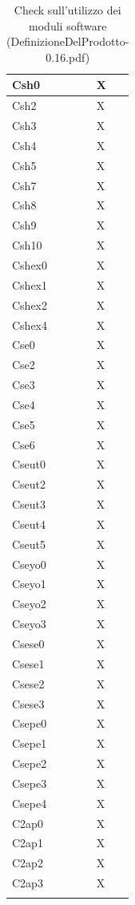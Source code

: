 \begin{footnotesize}
\begin{longtable}{|p{}|p{}|}
Csh0 &X\\\hline 
Csh2 &X\\\hline 
Csh3 &X\\\hline 
Csh4 &X\\\hline 
Csh5 &X\\\hline 
Csh7 &X\\\hline 
Csh8 &X\\\hline 
Csh9 &X\\\hline 
Csh10 &X\\\hline 
Cshex0 &X\\\hline 
Cshex1 &X\\\hline 
Cshex2 &X\\\hline 
Cshex4 &X\\\hline 
Cse0 &X\\\hline 
Cse2 &X\\\hline 
Cse3 &X\\\hline 
Cse4 &X\\\hline 
Cse5 &X\\\hline 
Cse6 &X\\\hline 
Cseut0 &X\\\hline 
Cseut2 &X\\\hline 
Cseut3 &X\\\hline  
Cseut4 &X\\\hline
Cseut5 &X\\\hline
Cseyo0 &X\\\hline
Cseyo1 &X\\\hline
Cseyo2 &X\\\hline
Cseyo3 &X\\\hline
Csese0 &X\\\hline 
Csese1 &X\\\hline 
Csese2 &X\\\hline 
Csese3 &X\\\hline 
Csepe0 &X\\\hline 
Csepe1 &X\\\hline 
Csepe2 &X\\\hline 
Csepe3 &X\\\hline 
Csepe4 &X\\\hline 
C2ap0 &X\\\hline
C2ap1 &X\\\hline
C2ap2 &X\\\hline
C2ap3 &X\\\hline

\caption{Check sull'utilizzo dei moduli software
(DefinizioneDelProdotto-0.16.pdf)}
\end{longtable}
\end{footnotesize}


